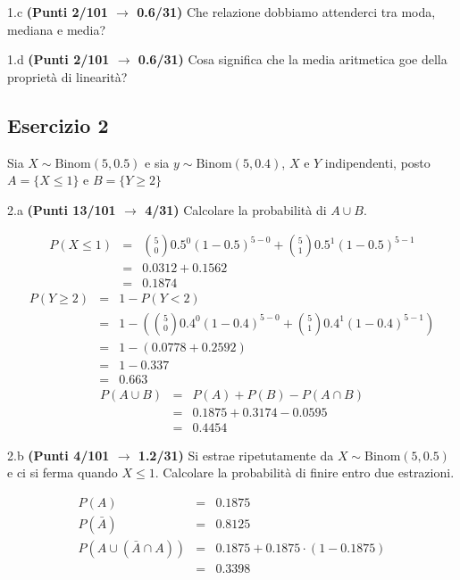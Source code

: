 \documentclass[
  11pt,
]{book}
\theoremstyle{mytheoremstyle}
\theoremstyle{mydefstyle}
\newenvironment{sol}
  {
  \begin{tcolorbox}[enhanced,breakable,arc=0.1mm,boxrule=1pt,colback=white,colframe=iblue,
  title=\bf \fontfamily{lmss}\selectfont \hspace{.5 cm} Soluzione,drop fuzzy shadow]

}{
\end{tcolorbox}
  }
\begin{document}
1.c \textbf{(Punti 2/101 \(\rightarrow\) 0.6/31)} Che relazione dobbiamo attenderci tra moda, mediana e media?

1.d \textbf{(Punti 2/101 \(\rightarrow\) 0.6/31)} Cosa significa che la media aritmetica goe della proprietà di linearità?

\subsection{Esercizio 2}\label{esercizio-2-27}

Sia \(X\sim\text{Binom}(5,0.5)\) e sia \(y\sim\text{Binom}(5,0.4)\), \(X\) e \(Y\) indipendenti, posto \(A=\{X\le 1\}\) e \(B=\{Y\ge 2\}\)

2.a \textbf{(Punti 13/101 \(\rightarrow\) 4/31)} Calcolare la probabilità di \(A\cup B\).

\begin{sol}
\normalsize 
\begin{eqnarray*}
      P( X \leq 1 ) &=& \binom{ 5 }{ 0 } 0.5 ^{ 0 }(1- 0.5 )^{ 5 - 0 }+\binom{ 5 }{ 1 } 0.5 ^{ 1 }(1- 0.5 )^{ 5 - 1 } \\                 &=& 0.0312+0.1562 \\                 &=& 0.1874 
   \end{eqnarray*}
\normalsize  \normalsize 
\begin{eqnarray*}
      P( Y \geq 2 ) &=& 1-P( Y < 2 ) \\                 &=& 1-\left( \binom{ 5 }{ 0 } 0.4 ^{ 0 }(1- 0.4 )^{ 5 - 0 }+\binom{ 5 }{ 1 } 0.4 ^{ 1 }(1- 0.4 )^{ 5 - 1 } \right)\\                 &=& 1-( 0.0778+0.2592 )\\                 &=& 1- 0.337 \\                 &=&   0.663 
   \end{eqnarray*}
\normalsize 
\begin{eqnarray*}
  P(A\cup B) &=&  P(A)+P(B)-P(A\cap B)\\
  &=& 0.1875+0.3174-0.0595\\
  &=& 0.4454
\end{eqnarray*}

\end{sol}

2.b \textbf{(Punti 4/101 \(\rightarrow\) 1.2/31)} Si estrae ripetutamente da \(X\sim\text{Binom}(5,0.5)\) e ci si ferma quando \(X\le 1\). Calcolare la probabilità di finire entro due estrazioni.

\begin{sol}
\begin{eqnarray*}
  P(A) &=&  0.1875\\
  P(\bar A) &=& 0.8125\\
  P(A\cup (\bar A\cap A))&=& 0.1875+0.1875\cdot (1-0.1875)\\
  &=& 0.3398
\end{eqnarray*}

\end{sol}
\end{document}
